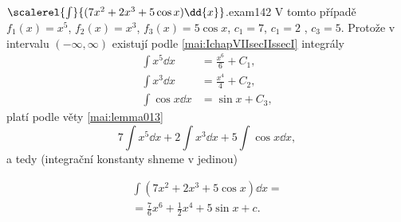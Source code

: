 \begin{mathexam}{\(\scalerel{\int}{(7x^2+2x^3+5\cos x)\dd{x}}\).}{exam142}
  V tomto případě \(f_1(x) = x^5\), \(f_2(x) = x^3\), \(f_3(x) = 5\cos x\), \(c_1=7\), \(c_1=2\) ,
  \(c_3=5\). Protože v intervalu \((-\infty, \infty)\) existují podle
  \eqref{mai:IchapVIIsecIIssecI} integrály
  \begin{align*}
    \int x^5\dd{x}   &= \frac{x^6}{6} + C_1, \\
    \int x^3\dd{x}   &= \frac{x^4}{4} + C_2, \\
    \int\cos x\dd{x} &= \sin x +C_3,
  \end{align*}
  platí podle věty \eqref{mai:lemma013} \[7\int x^5\dd{x} + 2\int x^3\dd{x} + 5\int\cos x\dd{x},\]
  a tedy (integrační konstanty shneme v jedinou)
  \begin{fleqn}[0pt]
    \begin{multline*}
      \int(7x^2+2x^3+5\cos x)\dd{x} = \\
        = \frac{7}{6}x^6 + \frac{1}{2}x^4 + 5\sin x + c.
    \end{multline*}
  \end{fleqn}
\end{mathexam}